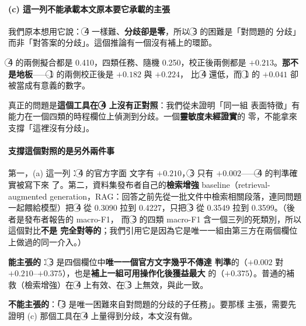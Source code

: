 \documentclass[11pt,a4paper]{ctexart}
\begin{document}
\paragraph{(c) 這一列不能承載本文原本要它承載的主張} 我們原本想用它說：
\textcircled{4} 一樣難、\textbf{分歧卻是零}，所以 \textcircled{3} 的困難是「對問題的
分歧」而非「對答案的分歧」。這個推論有一個沒有補上的環節。

\begin{tcolorbox}[colback=gray!8, colframe=gray!55, title=為什麼 (c) 只能當作補充]
\textcircled{4} 的兩側擬合都是 0.410，四類任務、隨機 0.250，校正後兩側都是
$+0.213$。\textbf{那不是地板}——\textcircled{1} 的兩側校正後是 $+0.182$ 與 $+0.224$，
比 \textcircled{4} 還低，而 \textcircled{1} 的 $+0.041$ 卻被當成有意義的數字。

\medskip
真正的問題是\textbf{這個工具在 \textcircled{4} 上沒有正對照}：我們從未證明「同一組
表面特徵」有能力在一個四類的時程欄位上偵測到分歧。一個\textbf{靈敏度未經證實}的
零，不能拿來支撐「這裡沒有分歧」。
\end{tcolorbox}

\paragraph{支撐這個對照的是另外兩件事} 第一，(a) 這一列：\textcircled{4} 的官方字面
文字有 $+0.210$，\textcircled{3} 只有 $+0.002$——\textcircled{4} 的判準確實被寫下來
了。第二，資料集發布者自己的\textbf{檢索增強} baseline（retrieval-augmented
generation，RAG：回答之前先從一批文件中檢索相關段落，連同問題一起餵給模型）把
\textcircled{4} 從 0.3090 拉到
0.4227，只把 \textcircled{3} 從 0.3549 拉到 0.3599。（後者是發布者報告的 macro-F1，
而 \textcircled{3} 的四類 macro-F1 含一個三列的死類別，所以這個對比\textbf{不是
完全對等的}；我們引用它是因為它是唯一一組由第三方在兩個欄位上做過的同一介入。）

\begin{tcolorbox}[colback=green!5, colframe=green!45, title=能主張到什麼程度]
\textbf{能主張的}：\textcircled{3} 是四個欄位中\textbf{唯一一個官方文字幾乎不傳達
判準}的（$+0.002$ 對 $+0.210$--$+0.375$），也是\textbf{補上一組可用操作化後獲益最大}
的（$+0.375$）。普通的補救（檢索增強）在 \textcircled{4} 上有效、在 \textcircled{3}
上無效，與此一致。

\medskip
\textbf{不能主張的}：「\textcircled{3} 是唯一困難來自對問題的分歧的子任務」。要那樣
主張，需要先證明 (c) 那個工具在 \textcircled{4} 上量得到分歧，本文沒有做。
\end{tcolorbox}
\end{document}
